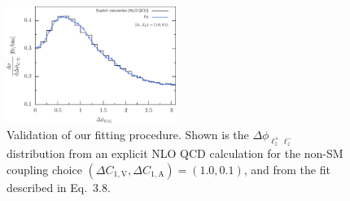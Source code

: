 \documentclass[preprint]{JHEP3} %
\def\DConeA{\Delta C_{1,\mathrm{A}}}
\def\DConeV{\Delta C_{1,\mathrm{V}}}
\begin{document}
\begin{figure}[t]
\centering %
\includegraphics[width=0.49\textwidth]{./LHC_53_Fig17d.eps}
\caption{\label{fig:iv} Validation of our fitting procedure. Shown is the $\Delta \phi_{\ell^+_z \ell^-_z}$ distribution from an explicit NLO QCD calculation 
for the non-SM coupling choice $(\DConeV,\DConeA)=(1.0,0.1)$, and from the fit described in Eq.~3.8. }
\end{figure}
\end{document}
